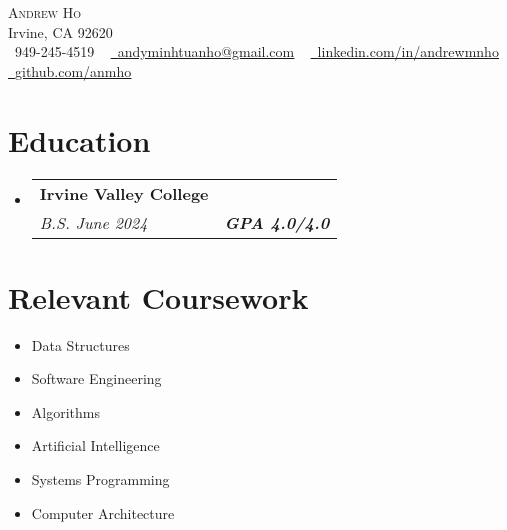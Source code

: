 \documentclass[letterpaper,11pt]{article}
\makeatletter
\newcommand{\resumeSubheading}[4]{
  \vspace{-2pt}\item
    \begin{tabular*}{1.0\textwidth}[t]{l@{\extracolsep{\fill}}r}
      \textbf{#1} & \textbf{\small #2} \\
      \textit{\small#3} & \textit{\small #4} \\
    \end{tabular*}\vspace{-7pt}
}
\newcommand{\resumeSubHeadingListStart}{\begin{itemize}[leftmargin=0.0in, label={}]}
\newcommand{\resumeSubHeadingListEnd}{\end{itemize}}
\makeatother
\begin{document}

\begin{center}
    {\Huge \scshape Andrew Ho} \\ \vspace{1pt}
    Irvine, CA 92620 \\ \vspace{1pt}
    \small \raisebox{-0.1\height}\faPhone\ 949-245-4519 ~ \href{mailto:x@gmail.com}{\raisebox{-0.2\height}\faEnvelope\  \underline{andyminhtuanho@gmail.com}} ~
    \href{https://linkedin.com/in/andrewmnho/}{\raisebox{-0.2\height}\faLinkedin\ \underline{linkedin.com/in/andrewmnho}}  ~
    \href{https://github.com/}{\raisebox{-0.2\height}\faGithub\ \underline{github.com/anmho}}
    \vspace{-8pt}
\end{center}


\section{Education}
\resumeSubHeadingListStart
\resumeSubheading
{Irvine Valley College \normalfont{\small{-- Irvine, CA}}}{\normalfont{Computer Science}}
{B.S. June 2024} {\textbf{GPA 4.0/4.0}}
\resumeSubHeadingListEnd

\section{Relevant Coursework}
\begin{multicols}{4}
    \begin{itemize}[itemsep=-5pt, parsep=3pt]
        \item\small Data Structures
        \item Software Engineering
        \item Algorithms
        \item Artificial Intelligence
        \item Systems Programming
        \item Computer Architecture
    \end{itemize}
\end{multicols}
\vspace*{2.0\multicolsep}
\end{document}
